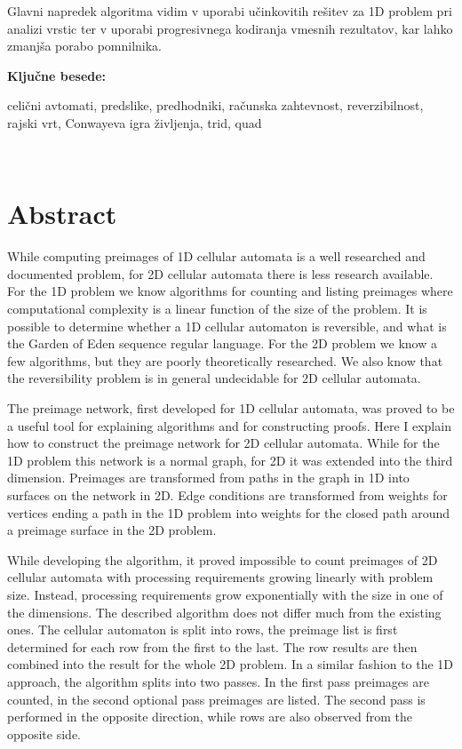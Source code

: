 \documentclass[12pt,a4paper,openany,twoside]{book}
\begin{document}
Glavni napredek algoritma vidim v uporabi učinkovitih rešitev za 1D problem pri analizi vrstic ter
v uporabi progresivnega kodiranja vmesnih rezultatov, kar lahko zmanjša porabo pomnilnika.

\vspace{1.3cm}
\noindent
{\large \bf Ključne besede:}

\vspace{0.5cm}
\noindent
celični avtomati, predslike, predhodniki, računska zahtevnost, reverzibilnost, rajski vrt, Conwayeva igra življenja, trid, quad
\newpage

\ \thispagestyle{empty}
\newpage

\chapter*{Abstract}


While computing preimages of 1D cellular automata is a well researched and documented problem,
for 2D cellular automata there is less research available.
For the 1D problem we know algorithms for counting and listing preimages
where computational complexity is a linear function of the size of the problem.
It is possible to determine whether a 1D cellular automaton is reversible,
and what is the Garden of Eden sequence regular language.
For the 2D problem we know a few algorithms,
but they are poorly theoretically researched.
We also know that the reversibility problem is
in general undecidable for 2D cellular automata.

The preimage network, first developed for 1D cellular automata,
was proved to be a useful tool for explaining algorithms and for constructing proofs.
Here I explain how to construct the preimage network for 2D cellular automata.
While for the 1D problem this network is a normal graph,
for 2D it was extended into the third dimension.
Preimages are transformed from paths in the graph in 1D into surfaces on the network in 2D.
Edge conditions are transformed from weights for vertices ending a path in the 1D problem
into weights for the closed path around a preimage surface in the 2D problem.

While developing the algorithm, it proved impossible
to count preimages of 2D cellular automata
with processing requirements growing linearly with problem size.
Instead, processing requirements grow exponentially
with the size in one of the dimensions.
The described algorithm does not differ much from the existing ones.
The cellular automaton is split into rows,
the preimage list is first determined for each row from the first to the last.
The row results are then combined into the result for the whole 2D problem.
In a similar fashion to the 1D approach,
the algorithm splits into two passes.
In the first pass preimages are counted,
in the second optional pass preimages are listed.
The second pass is performed in the opposite direction,
while rows are also observed from the opposite side.
\end{document}

